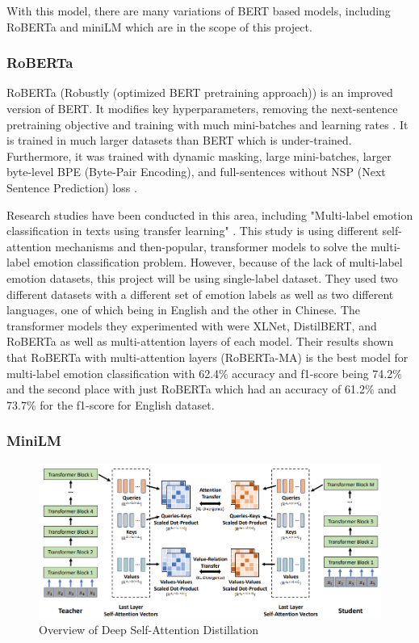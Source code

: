 With this model, there are many variations of BERT based models, including RoBERTa and miniLM which are in the scope of this project. 

\subsubsection{RoBERTa}
RoBERTa (Robustly (optimized BERT pretraining approach)) is an improved version of BERT.
It modifies key hyperparameters, removing the next-sentence pretraining objective and training with much mini-batches and learning rates \cite{Sharma_2022}.
It is trained in much larger datasets than BERT which is under-trained. 
Furthermore, it was trained with dynamic masking, large mini-batches, larger byte-level BPE (Byte-Pair Encoding), and full-sentences without NSP (Next Sentence Prediction) loss \cite{Sharma_2022}.

Research studies have been conducted in this area, including "Multi-label emotion classification in texts using transfer learning" \cite{AMEER2023118534}. This study is using different self-attention mechanisms and then-popular, transformer models to solve the multi-label emotion classification problem.
However, because of the lack of multi-label emotion datasets, this project will be using single-label dataset.
They used two different datasets with a different set of emotion labels as well as two different languages, one of which being in English and the other in Chinese.
The transformer models they experimented with were XLNet, DistilBERT, and RoBERTa as well as multi-attention layers of each model.
Their results shown that RoBERTa with multi-attention layers (RoBERTa-MA) is the best model for multi-label emotion classification with 62.4\% accuracy and f1-score being 74.2\% and the second place with just RoBERTa which had an accuracy of 61.2\% and 73.7\% for the f1-score for English dataset. 

\subsubsection{MiniLM}

\begin{figure}[ht]
    \centerline{\includegraphics[scale=.5]{Figures/deep_self-distillation.png}}
    \caption{Overview of Deep Self-Attention Distillation}
    \label{fig:distillation}
 \end{figure}

